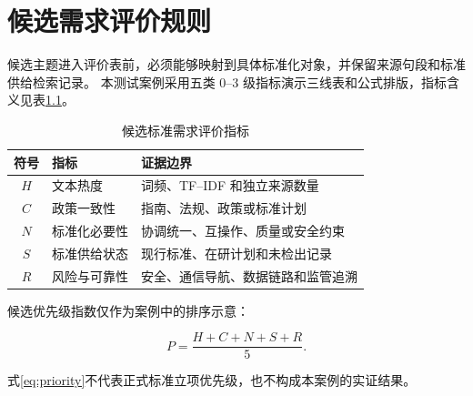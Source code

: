 \chapter{候选需求评价规则}

候选主题进入评价表前，必须能够映射到具体标准化对象，并保留来源句段和标准供给检索记录。
本测试案例采用五类 $0$--$3$ 级指标演示三线表和公式排版，指标含义见表\ref{tab:indicators}。

\begin{table}[htbp]
  \centering
  \caption{候选标准需求评价指标}
  \label{tab:indicators}
  \begin{tabularx}{\textwidth}{cX X}
    \toprule
    符号 & 指标 & 证据边界 \\
    \midrule
    $H$ & 文本热度 & 词频、TF--IDF 和独立来源数量 \\
    $C$ & 政策一致性 & 指南、法规、政策或标准计划 \\
    $N$ & 标准化必要性 & 协调统一、互操作、质量或安全约束 \\
    $S$ & 标准供给状态 & 现行标准、在研计划和未检出记录 \\
    $R$ & 风险与可靠性 & 安全、通信导航、数据链路和监管追溯 \\
    \bottomrule
  \end{tabularx}
\end{table}

候选优先级指数仅作为案例中的排序示意：

\begin{equation}
  P=\frac{H+C+N+S+R}{5}.
  \label{eq:priority}
\end{equation}

式\eqref{eq:priority}不代表正式标准立项优先级，也不构成本案例的实证结果。
